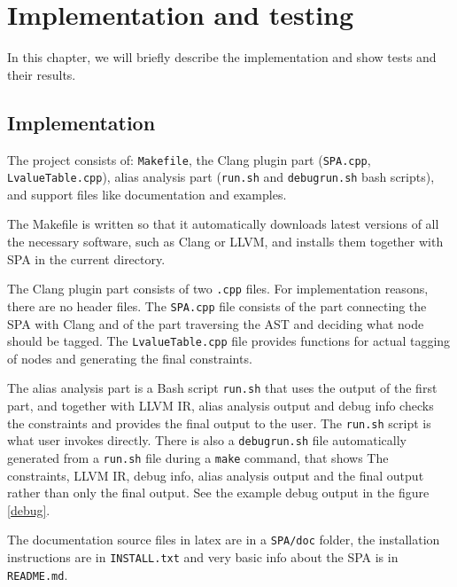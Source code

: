 \chapter{Implementation and testing}
In this chapter, we will briefly describe the implementation and show tests and their results.
\section{Implementation}
The project consists of: \verb|Makefile|, the Clang plugin part (\verb|SPA.cpp|, \verb|LvalueTable.cpp|), alias analysis part (\verb|run.sh| and \verb|debugrun.sh| bash scripts), and support files like documentation and examples.

The Makefile is written so that it automatically downloads latest versions of all the necessary software, such as Clang or LLVM, and installs them together with SPA in the current directory.

The Clang plugin part consists of two \verb|.cpp| files. For implementation reasons, there are no header files. The \verb|SPA.cpp| file consists of the part connecting the SPA with Clang and of the part traversing the AST and deciding what node should be tagged. The \verb|LvalueTable.cpp| file provides functions for actual tagging of nodes and generating the final constraints.

The alias analysis part is a Bash script \verb|run.sh| that uses the output of the first part, and together with LLVM IR, alias analysis output and debug info checks the constraints and provides the final output to the user. The \verb|run.sh| script is what user invokes directly. There is also a \verb|debugrun.sh| file automatically generated from a \verb|run.sh| file during a \verb|make| command, that shows The constraints, LLVM IR, debug info, alias analysis output and the final output rather than only the final output. See the example debug output in the figure \ref{debug}.

The documentation source files in latex are in a \verb|SPA/doc| folder, the installation instructions are in \verb|INSTALL.txt| and very basic info about the SPA is in \verb|README.md|.


